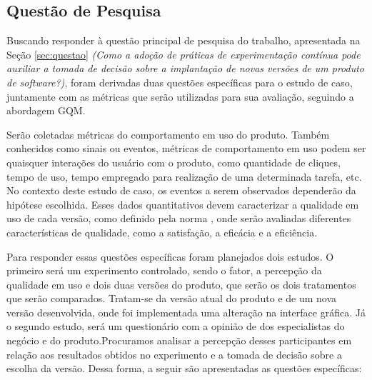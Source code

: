 \subsection{Questão de Pesquisa}
\label{subsec:estudo-questao}

Buscando responder à questão principal de pesquisa do trabalho, apresentada na Seção \ref{sec:questao} \textit{(Como a adoção de práticas de experimentação contínua pode auxiliar a tomada de decisão sobre a implantação de novas versões de um produto de software?)}, foram derivadas duas questões específicas para o estudo de caso, juntamente com as métricas que serão utilizadas para sua avaliação, seguindo a abordagem GQM.

Serão coletadas métricas do comportamento em uso do produto. Também conhecidos como sinais ou eventos, métricas de comportamento em uso podem ser quaisquer interações do usuário com o produto, como quantidade de cliques, tempo de uso, tempo empregado para realização de uma determinada tarefa, etc. No contexto deste estudo de caso, os eventos a serem observados dependerão da hipótese escolhida. Esses dados quantitativos devem caracterizar a qualidade em uso de cada versão, como definido pela norma , onde serão avaliadas diferentes características de qualidade, como a satisfação, a eficácia e a eficiência.

Para responder essas questões específicas foram planejados dois estudos. O primeiro será um experimento controlado, sendo o fator, a percepção da qualidade em uso e dois duas versões do produto, que serão os dois tratamentos que serão comparados. Tratam-se da versão atual do produto e de um nova versão desenvolvida, onde foi implementada uma alteração na interface gráfica. Já o segundo estudo, será um questionário com a opinião de dos especialistas do negócio e do produto.Procuramos analisar a percepção desses participantes em relação aos resultados obtidos no experimento e a tomada de decisão sobre a escolha da versão. Dessa forma, a seguir são apresentadas as questões específicas:

